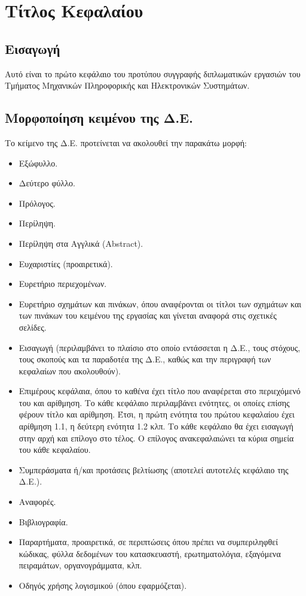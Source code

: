 \documentclass[twoside, a4paper, 11pt]{article}
\begin{document}

\setlength{\parskip}{1em}

\section{Τίτλος Κεφαλαίου}

\subsection{Εισαγωγή}
Αυτό είναι το πρώτο κεφάλαιο του προτύπου συγγραφής διπλωματικών εργασιών του Τμήματος Μηχανικών Πληροφορικής και Ηλεκτρονικών Συστημάτων. 

\subsection{Μορφοποίηση κειμένου της Δ.Ε. }
Το κείμενο της Δ.Ε. προτείνεται να ακολουθεί την παρακάτω μορφή: 
\begin{itemize}
    \setlength\itemsep{0em}
    \item Εξώφυλλο.
    \item Δεύτερο φύλλο.
    \item Πρόλογος. 
    \item Περίληψη. 
    \item Περίληψη στα Αγγλικά (Abstract). 
    \item Ευχαριστίες (προαιρετικά). 
    \item Ευρετήριο περιεχομένων. 
    \item Ευρετήριο σχημάτων και πινάκων, όπου αναφέρονται οι τίτλοι των σχημάτων και των πινάκων του κειμένου της εργασίας και γίνεται αναφορά στις σχετικές σελίδες. 
    \item Εισαγωγή (περιλαμβάνει το πλαίσιο στο οποίο εντάσσεται η Δ.Ε., τους στόχους, τους σκοπούς και τα παραδοτέα της Δ.Ε., καθώς και την περιγραφή των κεφαλαίων που ακολουθούν). 
    \item Επιμέρους κεφάλαια, όπου το καθένα έχει τίτλο που αναφέρεται στο περιεχόμενό του και αρίθμηση. Το κάθε κεφάλαιο περιλαμβάνει ενότητες, οι οποίες επίσης φέρουν τίτλο και αρίθμηση. Έτσι, η πρώτη ενότητα του πρώτου κεφαλαίου έχει αρίθμηση 1.1, η δεύτερη ενότητα 1.2 κλπ. Το κάθε κεφάλαιο θα έχει εισαγωγή στην αρχή και επίλογο στο τέλος. Ο επίλογος ανακεφαλαιώνει τα κύρια σημεία του κάθε κεφαλαίου. 
    \item Συμπεράσματα ή/και προτάσεις βελτίωσης (αποτελεί αυτοτελές κεφάλαιο της Δ.Ε.). 
    \item Αναφορές. 
    \item Βιβλιογραφία. 
    \item Παραρτήματα, προαιρετικά, σε περιπτώσεις όπου πρέπει να συμπεριληφθεί κώδικας, φύλλα δεδομένων του κατασκευαστή, ερωτηματολόγια, εξαγόμενα πειραμάτων, οργανογράμματα, κλπ. 
    \item Οδηγός χρήσης λογισμικού (όπου εφαρμόζεται). 

\end{itemize}
\end{document}
